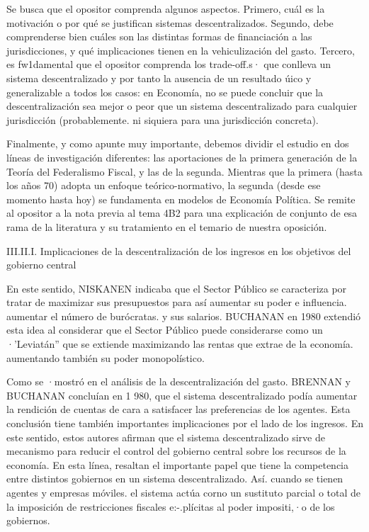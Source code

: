 \documentclass[10pt,a4paper]{article}
\begin{document}
Se busca que el opositor comprenda algunos aspectos. Primero, cuál es la motivación o por qué se justifican sistemas descentralizados. Segundo, debe comprenderse bien cuáles son las distintas formas de financiación a las jurisdicciones, y qué implicaciones tienen en la vehiculización del gasto. Tercero, es fw1damental que el opositor comprenda los trade-off.s· que conlleva un sistema descentralizado y por tanto la ausencia de un resultado úico y generalizable a todos los casos: en Economía, no se puede concluir que la descentralización sea mejor o peor que un sistema descentralizado para cualquier jurisdicción (probablemente. ni siquiera para una jurisdicción concreta).

Finalmente, y como apunte muy importante, debemos dividir el estudio en dos líneas de investigación diferentes: las aportaciones de la primera generación de la Teoría del Federalismo Fiscal, y las de la segunda. Mientras que la primera (hasta los años 70) adopta un enfoque teórico-normativo, la segunda (desde ese momento hasta hoy) se fundamenta en modelos de Economía Política. Se remite al opositor a la nota previa al tema 4B2 para una explicación de conjunto de esa rama de la literatura y su tratamiento en el temario de nuestra oposición.




III.II.I. Implicaciones de la descentralización de los ingresos en los objetivos del gobierno central

En este sentido, NISKANEN indicaba que el Sector Público se caracteriza por tratar de maximizar sus presupuestos para así aumentar su poder e influencia. aumentar el número de burócratas. y sus salarios. BUCHANAN en 1980 extendió esta idea al considerar que el Sector Público puede considerarse como un ·'Leviatán'' que se extiende maximizando las rentas que extrae de la economía. aumentando también su poder monopolístico.

Como se ·mostró en el análisis de la descentralización del gasto. BRENNAN y BUCHANAN concluían en 1 980, que el sistema descentralizado podía aumentar la rendición de cuentas de cara a satisfacer las preferencias de los agentes. Esta conclusión tiene también importantes implicaciones por el lado de los ingresos. En este sentido, estos autores afirman que el sistema descentralizado sirve de mecanismo para reducir el control del gobierno central sobre los recursos de la economía. En esta línea, resaltan el importante papel que tiene la competencia entre distintos gobiernos en un sistema descentralizado. Así. cuando se tienen agentes y empresas móviles. el sistema actúa corno un sustituto parcial o total de la imposición de restricciones fiscales e:-.plícitas al poder impositi,·o de los gobiernos.
\end{document}
